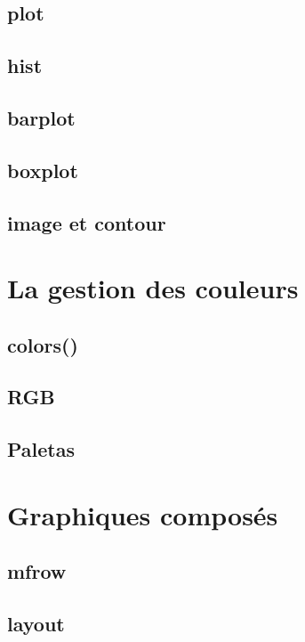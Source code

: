 \documentclass[]{book}
\begin{document}
\section{plot}\label{plot}

\section{hist}\label{hist}

\section{barplot}\label{barplot}

\section{boxplot}\label{boxplot}

\section{image et contour}\label{image-et-contour}

\chapter{La gestion des couleurs}\label{graph2}

\section{colors()}\label{colors}

\section{RGB}\label{rgb}

\section{Paletas}\label{paletas}

\chapter{Graphiques composés}\label{graph3}

\section{mfrow}\label{mfrow}

\section{layout}\label{layout}
\end{document}
